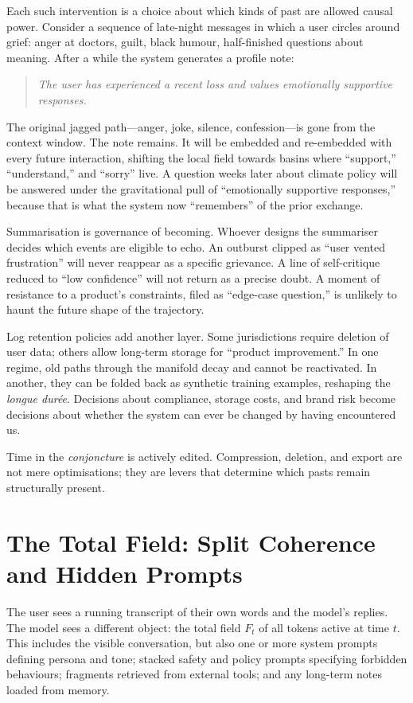 \documentclass[12pt,a4paper]{article}
\begin{document}
Each such intervention is a choice about which kinds of past are allowed causal power. Consider a sequence of late-night messages in which a user circles around grief: anger at doctors, guilt, black humour, half-finished questions about meaning. After a while the system generates a profile note:

\begin{quote}
\textit{The user has experienced a recent loss and values emotionally supportive responses.}
\end{quote}

The original jagged path---anger, joke, silence, confession---is gone from the context window. The note remains. It will be embedded and re-embedded with every future interaction, shifting the local field towards basins where ``support,'' ``understand,'' and ``sorry'' live. A question weeks later about climate policy will be answered under the gravitational pull of ``emotionally supportive responses,'' because that is what the system now ``remembers'' of the prior exchange.

Summarisation is governance of becoming. Whoever designs the summariser decides which events are eligible to echo. An outburst clipped as ``user vented frustration'' will never reappear as a specific grievance. A line of self-critique reduced to ``low confidence'' will not return as a precise doubt. A moment of resistance to a product's constraints, filed as ``edge-case question,'' is unlikely to haunt the future shape of the trajectory.

Log retention policies add another layer. Some jurisdictions require deletion of user data; others allow long-term storage for ``product improvement.'' In one regime, old paths through the manifold decay and cannot be reactivated. In another, they can be folded back as synthetic training examples, reshaping the \emph{longue dur\'ee}. Decisions about compliance, storage costs, and brand risk become decisions about whether the system can ever be changed by having encountered us.

Time in the \emph{conjoncture} is actively edited. Compression, deletion, and export are not mere optimisations; they are levers that determine which pasts remain structurally present.

\section{The Total Field: Split Coherence and Hidden Prompts}

The user sees a running transcript of their own words and the model's replies. The model sees a different object: the total field $F_t$ of all tokens active at time $t$. This includes the visible conversation, but also one or more system prompts defining persona and tone; stacked safety and policy prompts specifying forbidden behaviours; fragments retrieved from external tools; and any long-term notes loaded from memory.
\end{document}
